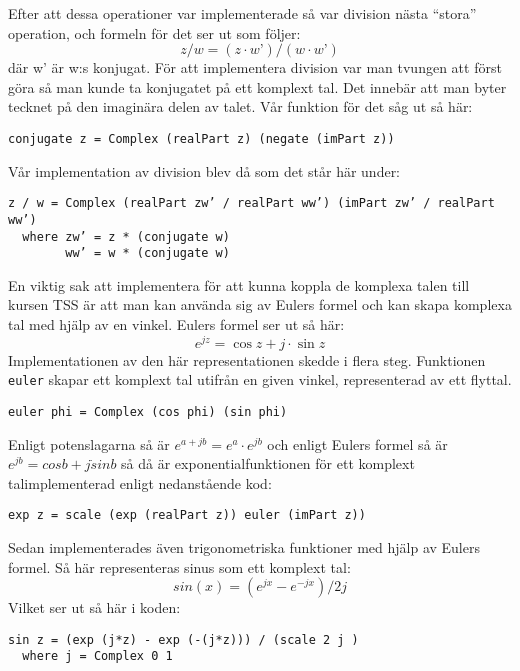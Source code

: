 \documentclass[]{article}
\begin{document}
Efter att dessa operationer var implementerade så var division nästa ``stora''
operation, och formeln för det ser ut som följer:
\[ z / w = (z \cdot w’) / (w \cdot w’) \]
där w’ är w:s konjugat.
För att implementera division var man tvungen att först göra så man kunde ta
konjugatet på ett komplext tal.
Det innebär att man byter tecknet på den imaginära delen av talet.
Vår funktion för det såg ut så här:
\begin{verbatim}
conjugate z = Complex (realPart z) (negate (imPart z))
\end{verbatim}
Vår implementation av division blev då som det står här under:
\begin{verbatim}
z / w = Complex (realPart zw’ / realPart ww’) (imPart zw’ / realPart ww’)
  where zw’ = z * (conjugate w)
        ww’ = w * (conjugate w)
\end{verbatim}

En viktig sak att implementera för att kunna koppla de komplexa talen till
kursen TSS är att man kan använda sig av Eulers formel och kan skapa komplexa
tal med hjälp av en vinkel. Eulers formel ser ut så här:
\[e^{jz}=\cos z+ j \cdot \sin z \]
Implementationen av den här representationen skedde i flera steg.
Funktionen \texttt{euler} skapar ett komplext tal utifrån en
given vinkel, representerad av ett flyttal.
\begin{verbatim}
euler phi = Complex (cos phi) (sin phi)
\end{verbatim}
Enligt potenslagarna%
så är \(e^{a+jb} = e^{a} \cdot e^{jb}\) och enligt Eulers formel så är
\(e^{j b} = cos b + j\dot sin b\) så då är exponentialfunktionen för ett
komplext talimplementerad enligt nedanstående kod:
\begin{verbatim}
exp z = scale (exp (realPart z)) euler (imPart z))
\end{verbatim}
Sedan implementerades även trigonometriska funktioner med hjälp av Eulers
formel. Så här representeras sinus som ett komplext tal:
\[ sin(x) = (e^{j x} - e^{-j x}) / 2 j \]
Vilket ser ut så här i koden:
\begin{verbatim}
sin z = (exp (j*z) - exp (-(j*z))) / (scale 2 j )
  where j = Complex 0 1
\end{verbatim}
\end{document}
